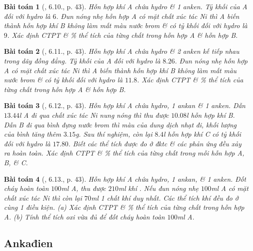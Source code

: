 \documentclass{article}
\newtheorem{baitoan}{Bài toán}
\begin{document}
\begin{baitoan}[\cite{SBT_Hoa_Hoc_11_co_ban}, 6.10., p. 43]
	Hỗn hợp khí A chứa hydro \& 1 anken. Tỷ khối của A đối với hydro là $6$. Đun nóng nhẹ hỗn hợp A có mặt chất xúc tác \emph{Ni} thì A biến thành hỗn hợp khí B không làm mất màu nước brom \& có tỷ khối đối với hydro là $9$. Xác định CTPT \& \% thể tích của từng chất trong hỗn hợp A \& hỗn hợp B.
\end{baitoan}

\begin{baitoan}[\cite{SBT_Hoa_Hoc_11_co_ban}, 6.11., p. 43]
	Hỗn hợp khí A chứa hydro \& 2 anken kế tiếp nhau trong dãy đồng đẳng. Tỷ khối của A đối với hydro là $8.26$. Đun nóng nhẹ hỗn hợp A có mặt chất xúc tác \emph{Ni} thì A biến thành hỗn hợp khí B không làm mất màu nước brom \& có tỷ khối đối với hydro là $11.8$. Xác định CTPT \& \% thể tích của từng chất trong hỗn hợp A \& hỗn hợp B.
\end{baitoan}

\begin{baitoan}[\cite{SBT_Hoa_Hoc_11_co_ban}, 6.12., p. 43]
	Hỗn hợp khí A chứa hydro, 1 ankan \& 1 anken. Dẫn $13.44$\emph{l} A đi qua chất xúc tác \emph{Ni} nung nóng thì thu được $10.08$\emph{l} hỗn hợp khí B. Dẫn B đi qua bình đựng nước brom thì màu của dung dịch nhạt đi, khối lượng của bình tăng thêm $3.15$\emph{g}. Sau thí nghiệm, còn lại $8.4$\emph{l} hỗn hợp khí C có tỷ khối đối với hydro là $17.80$. Biết các thể tích được đo ở đktc \& các phản ứng đều xảy ra hoàn toàn. Xác định CTPT \& \% thể tích của từng chất trong mỗi hỗn hợp A, B, \& C.
\end{baitoan}

\begin{baitoan}[\cite{SBT_Hoa_Hoc_11_co_ban}, 6.13., p. 43]
	Hỗn hợp khí A chứa hydro, 1 ankan, \& 1 anken. Đốt cháy hoàn toàn $100$\emph{ml} A, thu được $210$\emph{ml} khí \emph{}. Nếu đun nóng nhẹ $100$\emph{ml} A có mặt chất xúc tác \emph{Ni} thì còn lại $70$\emph{ml} 1 chất khí duy nhất. Các thể  tích khí đều đo ở cùng 1 điều kiện. (a) Xác định CTPT \& \% thể tích của từng chất trong hỗn hợp A. (b) Tính thể tích oxi vừa đủ để đốt cháy hoàn toàn $100$\emph{ml} A.
\end{baitoan}


\subsection{Ankađien}
\end{document}
